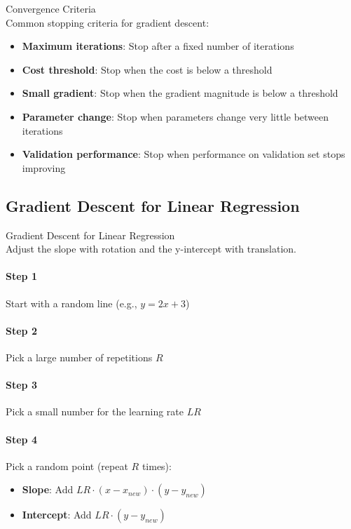 \begin{concept}{Convergence Criteria}\\
Common stopping criteria for gradient descent:
\begin{itemize}
    \item \textbf{Maximum iterations}: Stop after a fixed number of iterations
    \item \textbf{Cost threshold}: Stop when the cost is below a threshold
    \item \textbf{Small gradient}: Stop when the gradient magnitude is below a threshold
    \item \textbf{Parameter change}: Stop when parameters change very little between iterations
    \item \textbf{Validation performance}: Stop when performance on validation set stops improving
\end{itemize}
\end{concept}

\subsection{Gradient Descent for Linear Regression}

\begin{KR}{Gradient Descent for Linear Regression}\\
Adjust the slope with rotation and the y-intercept with translation.

\paragraph{Step 1}
Start with a random line (e.g., $y = 2x + 3$)

\paragraph{Step 2}
Pick a large number of repetitions $R$

\paragraph{Step 3}
Pick a small number for the learning rate $LR$

\paragraph{Step 4}
Pick a random point (repeat $R$ times):
\begin{itemize}
    \item \textbf{Slope}: Add $LR \cdot (x - x_{new}) \cdot (y - y_{new})$
    \item \textbf{Intercept}: Add $LR \cdot (y - y_{new})$
\end{itemize}
\end{KR}

